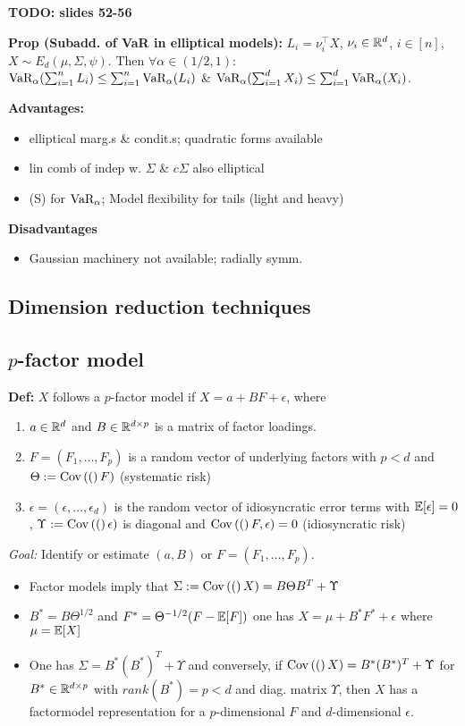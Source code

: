 \textbf{TODO: slides 52-56}

\textbf{Prop (Subadd. of VaR in elliptical models):}
$L_i=\nu_i^\top X$, $\nu_i\in\mathbb{R}^d$, $i\in[n]$, $X\sim E_d(\mu, \Sigma, \psi)$.
Then $\forall \alpha\in (1/2, 1)$:\\
$\text{VaR}_\alpha (\sum^n_{i=1} L_i)\leq \sum^n_{i=1} \text{VaR}_\alpha (L_i)$ \& $\text{VaR}_\alpha(\sum^d_{i=1} X_i)\leq  \sum^d_{i=1} \text{VaR}_\alpha (X_i)$.

\textbf{Advantages:}
\begin{itemize}
    \item elliptical marg.s \& condit.s; quadratic forms available
    \item lin comb of indep w. $\Sigma$ \& $c\Sigma$ also elliptical
    \item (S) for $\text{VaR}_\alpha$; Model flexibility for tails (light and heavy)
\end{itemize}

\textbf{Disadvantages}
\begin{itemize}
    \item Gaussian machinery not available; radially symm.
\end{itemize}

\subsection*{Dimension reduction techniques}

\subsection*{$p$-factor model}
\textbf{Def:} $X$ follows a $p$-factor model if $X = a + BF + \epsilon$, where
\begin{enumerate}
    \item $a\in\mathbb{R}^d$ and $B\in \mathbb{R}^{d\times p}$ is a matrix of factor loadings.
    \item $F = (F_1, \dots, F_p)$ is a random vector of underlying factors with $p < d$ and $\Theta:=\operatorname{Cov}\left(( \right)F)$ (systematic risk)
    \item $\epsilon = (\epsilon, \dots, \epsilon_d)$ is the random vector of idiosyncratic error terms with $\mathbb{E}[\epsilon] = 0$, $\Upsilon:= \operatorname{Cov}\left(( \right)\epsilon)$ is diagonal
    and $\operatorname{Cov}\left(( \right)F,\epsilon) = 0$ (idiosyncratic risk)
\end{enumerate}

\textit{Goal:} Identify or estimate $(a,B)$ or $F = (F_1, \dots, F_p)$. \\
\begin{itemize}
    \item Factor models imply that $\Sigma := \operatorname{Cov}\left(( \right)X) = B\Theta B^T + \Upsilon$
    \item $B^{*} = B\Theta^{1/2}$ and $F^{*} = \Theta^{-1/2}(F - \mathbb{E}[F])$ one has $X = \mu + B^{*}F^{*} + \epsilon$ where $\mu = \mathbb{E}[X]$
    \item One has $\Sigma = B^{*}(B^{*})^T + \Upsilon$ and conversely, if $\operatorname{Cov}\left(( \right)X) = B^{*}(B^{*})^T + \Upsilon$ for $B^{*} \in \mathbb{R}^{d\times p}$ with $rank(B^{*}) = p < d$ and diag. matrix $\Upsilon$, then $X$ has a factormodel representation for a $p$-dimensional $F$ and $d$-dimensional $\epsilon$.
\end{itemize}
